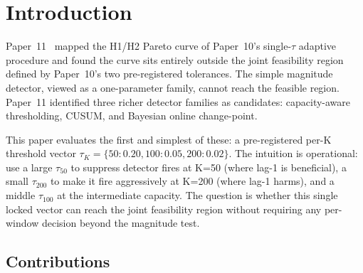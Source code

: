 \section{Introduction}

Paper~11~\cite{paper11tau} mapped the H1/H2 Pareto curve of Paper~10's
single-$\tau$ adaptive procedure and found the curve sits entirely
outside the joint feasibility region defined by Paper~10's two
pre-registered tolerances. The simple magnitude detector, viewed
as a one-parameter family, cannot reach the feasible region.
Paper~11 identified three richer detector families as candidates:
capacity-aware thresholding, CUSUM, and Bayesian online change-point.

This paper evaluates the first and simplest of these: a pre-registered
per-K threshold vector $\tau_K = \{50: 0.20, 100: 0.05, 200: 0.02\}$.
The intuition is operational: use a large $\tau_{50}$ to suppress
detector fires at K=50 (where lag-1 is beneficial), a small
$\tau_{200}$ to make it fire aggressively at K=200 (where lag-1
harms), and a middle $\tau_{100}$ at the intermediate capacity. The
question is whether this single locked vector can reach the joint
feasibility region without requiring any per-window decision beyond
the magnitude test.

\subsection{Contributions}

